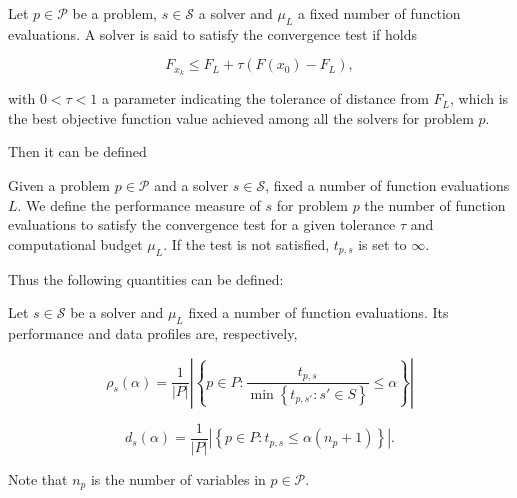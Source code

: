 \begin{defn}
	Let $p \in \mathcal{P}$ be a problem, $s \in \mathcal{S}$ a solver and $\mu_L$ a fixed number of function evaluations. A solver is said to satisfy the convergence test if holds
	
	\begin{equation}
		F_{x_k}\leq F_L + \tau (F(x_0) - F_L),
	\end{equation}

	with $0< \tau <1$ a parameter indicating the tolerance of distance from $F_L$, which is the best objective function value achieved among all the solvers for problem $p$.
\end{defn}

Then it can be defined

\begin{defn}
	Given a problem $p \in \mathcal{P}$ and a solver $s \in \mathcal{S}$, fixed a number of function evaluations $L$. We define the performance measure of $s$ for problem $p$ the number of function evaluations to satisfy the convergence test for a given tolerance $\tau$ and computational budget $\mu_L$. 
	If the test is not satisfied, $t_{p,s}$ is set to $\infty$.
\end{defn}

Thus the following quantities can be defined:

\begin{defn}
	Let $s \in \mathcal{S}$ be a solver and $\mu_L$ fixed a number of function evaluations. Its performance and data profiles are, respectively,
	
	\begin{equation}
		\rho_{s}(\alpha)=\frac{1}{|P|} \left| \left\{p \in P: \frac{t_{p, s}}{\min \left\{t_{p, s'}: s' \in S\right\}} \leq \alpha\right\} \right|
	\end{equation}

	\begin{equation}
		d_{s}(\alpha)=\frac{1}{|P|}\left|\left\{p \in P: t_{p, s} \leq \alpha\left(n_{p}+1\right)\right\}\right|. 
	\end{equation}

	Note that $n_p$ is the number of variables in $p \in \mathcal{P}$.
\end{defn}

